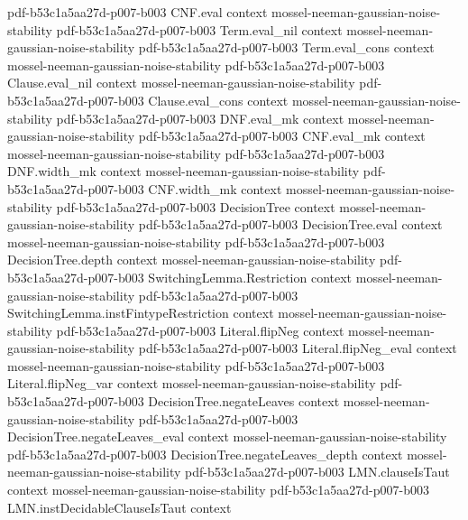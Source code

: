 \begin{theorem}
  {pdf-b53c1a5aa27d-p007-b003}
\proofstep
  {CNF.eval}
  {context}
  {mossel-neeman-gaussian-noise-stability}
  {pdf-b53c1a5aa27d-p007-b003}
\proofstep
  {Term.eval_nil}
  {context}
  {mossel-neeman-gaussian-noise-stability}
  {pdf-b53c1a5aa27d-p007-b003}
\proofstep
  {Term.eval_cons}
  {context}
  {mossel-neeman-gaussian-noise-stability}
  {pdf-b53c1a5aa27d-p007-b003}
\proofstep
  {Clause.eval_nil}
  {context}
  {mossel-neeman-gaussian-noise-stability}
  {pdf-b53c1a5aa27d-p007-b003}
\proofstep
  {Clause.eval_cons}
  {context}
  {mossel-neeman-gaussian-noise-stability}
  {pdf-b53c1a5aa27d-p007-b003}
\proofstep
  {DNF.eval_mk}
  {context}
  {mossel-neeman-gaussian-noise-stability}
  {pdf-b53c1a5aa27d-p007-b003}
\proofstep
  {CNF.eval_mk}
  {context}
  {mossel-neeman-gaussian-noise-stability}
  {pdf-b53c1a5aa27d-p007-b003}
\proofstep
  {DNF.width_mk}
  {context}
  {mossel-neeman-gaussian-noise-stability}
  {pdf-b53c1a5aa27d-p007-b003}
\proofstep
  {CNF.width_mk}
  {context}
  {mossel-neeman-gaussian-noise-stability}
  {pdf-b53c1a5aa27d-p007-b003}
\proofstep
  {DecisionTree}
  {context}
  {mossel-neeman-gaussian-noise-stability}
  {pdf-b53c1a5aa27d-p007-b003}
\proofstep
  {DecisionTree.eval}
  {context}
  {mossel-neeman-gaussian-noise-stability}
  {pdf-b53c1a5aa27d-p007-b003}
\proofstep
  {DecisionTree.depth}
  {context}
  {mossel-neeman-gaussian-noise-stability}
  {pdf-b53c1a5aa27d-p007-b003}
\proofstep
  {SwitchingLemma.Restriction}
  {context}
  {mossel-neeman-gaussian-noise-stability}
  {pdf-b53c1a5aa27d-p007-b003}
\proofstep
  {SwitchingLemma.instFintypeRestriction}
  {context}
  {mossel-neeman-gaussian-noise-stability}
  {pdf-b53c1a5aa27d-p007-b003}
\proofstep
  {Literal.flipNeg}
  {context}
  {mossel-neeman-gaussian-noise-stability}
  {pdf-b53c1a5aa27d-p007-b003}
\proofstep
  {Literal.flipNeg_eval}
  {context}
  {mossel-neeman-gaussian-noise-stability}
  {pdf-b53c1a5aa27d-p007-b003}
\proofstep
  {Literal.flipNeg_var}
  {context}
  {mossel-neeman-gaussian-noise-stability}
  {pdf-b53c1a5aa27d-p007-b003}
\proofstep
  {DecisionTree.negateLeaves}
  {context}
  {mossel-neeman-gaussian-noise-stability}
  {pdf-b53c1a5aa27d-p007-b003}
\proofstep
  {DecisionTree.negateLeaves_eval}
  {context}
  {mossel-neeman-gaussian-noise-stability}
  {pdf-b53c1a5aa27d-p007-b003}
\proofstep
  {DecisionTree.negateLeaves_depth}
  {context}
  {mossel-neeman-gaussian-noise-stability}
  {pdf-b53c1a5aa27d-p007-b003}
\proofstep
  {LMN.clauseIsTaut}
  {context}
  {mossel-neeman-gaussian-noise-stability}
  {pdf-b53c1a5aa27d-p007-b003}
\proofstep
  {LMN.instDecidableClauseIsTaut}
  {context}

\end{theorem}
